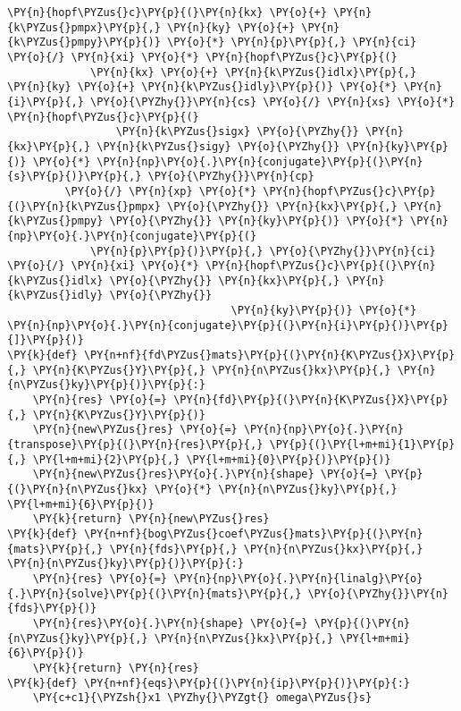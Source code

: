 \begin{Verbatim}[commandchars=\\\{\}]
         \PY{n}{hopf\PYZus{}c}\PY{p}{(}\PY{n}{kx} \PY{o}{+} \PY{n}{k\PYZus{}pmpx}\PY{p}{,} \PY{n}{ky} \PY{o}{+} \PY{n}{k\PYZus{}pmpy}\PY{p}{)} \PY{o}{*} \PY{n}{p}\PY{p}{,} \PY{n}{ci} \PY{o}{/} \PY{n}{xi} \PY{o}{*} \PY{n}{hopf\PYZus{}c}\PY{p}{(}
             \PY{n}{kx} \PY{o}{+} \PY{n}{k\PYZus{}idlx}\PY{p}{,} \PY{n}{ky} \PY{o}{+} \PY{n}{k\PYZus{}idly}\PY{p}{)} \PY{o}{*} \PY{n}{i}\PY{p}{,} \PY{o}{\PYZhy{}}\PY{n}{cs} \PY{o}{/} \PY{n}{xs} \PY{o}{*} \PY{n}{hopf\PYZus{}c}\PY{p}{(}
                 \PY{n}{k\PYZus{}sigx} \PY{o}{\PYZhy{}} \PY{n}{kx}\PY{p}{,} \PY{n}{k\PYZus{}sigy} \PY{o}{\PYZhy{}} \PY{n}{ky}\PY{p}{)} \PY{o}{*} \PY{n}{np}\PY{o}{.}\PY{n}{conjugate}\PY{p}{(}\PY{n}{s}\PY{p}{)}\PY{p}{,} \PY{o}{\PYZhy{}}\PY{n}{cp}
         \PY{o}{/} \PY{n}{xp} \PY{o}{*} \PY{n}{hopf\PYZus{}c}\PY{p}{(}\PY{n}{k\PYZus{}pmpx} \PY{o}{\PYZhy{}} \PY{n}{kx}\PY{p}{,} \PY{n}{k\PYZus{}pmpy} \PY{o}{\PYZhy{}} \PY{n}{ky}\PY{p}{)} \PY{o}{*} \PY{n}{np}\PY{o}{.}\PY{n}{conjugate}\PY{p}{(}
             \PY{n}{p}\PY{p}{)}\PY{p}{,} \PY{o}{\PYZhy{}}\PY{n}{ci} \PY{o}{/} \PY{n}{xi} \PY{o}{*} \PY{n}{hopf\PYZus{}c}\PY{p}{(}\PY{n}{k\PYZus{}idlx} \PY{o}{\PYZhy{}} \PY{n}{kx}\PY{p}{,} \PY{n}{k\PYZus{}idly} \PY{o}{\PYZhy{}}
                                   \PY{n}{ky}\PY{p}{)} \PY{o}{*} \PY{n}{np}\PY{o}{.}\PY{n}{conjugate}\PY{p}{(}\PY{n}{i}\PY{p}{)}\PY{p}{]}\PY{p}{)}
\PY{k}{def} \PY{n+nf}{fd\PYZus{}mats}\PY{p}{(}\PY{n}{K\PYZus{}X}\PY{p}{,} \PY{n}{K\PYZus{}Y}\PY{p}{,} \PY{n}{n\PYZus{}kx}\PY{p}{,} \PY{n}{n\PYZus{}ky}\PY{p}{)}\PY{p}{:}
    \PY{n}{res} \PY{o}{=} \PY{n}{fd}\PY{p}{(}\PY{n}{K\PYZus{}X}\PY{p}{,} \PY{n}{K\PYZus{}Y}\PY{p}{)}
    \PY{n}{new\PYZus{}res} \PY{o}{=} \PY{n}{np}\PY{o}{.}\PY{n}{transpose}\PY{p}{(}\PY{n}{res}\PY{p}{,} \PY{p}{(}\PY{l+m+mi}{1}\PY{p}{,} \PY{l+m+mi}{2}\PY{p}{,} \PY{l+m+mi}{0}\PY{p}{)}\PY{p}{)}
    \PY{n}{new\PYZus{}res}\PY{o}{.}\PY{n}{shape} \PY{o}{=} \PY{p}{(}\PY{n}{n\PYZus{}kx} \PY{o}{*} \PY{n}{n\PYZus{}ky}\PY{p}{,} \PY{l+m+mi}{6}\PY{p}{)}
    \PY{k}{return} \PY{n}{new\PYZus{}res}
\PY{k}{def} \PY{n+nf}{bog\PYZus{}coef\PYZus{}mats}\PY{p}{(}\PY{n}{mats}\PY{p}{,} \PY{n}{fds}\PY{p}{,} \PY{n}{n\PYZus{}kx}\PY{p}{,} \PY{n}{n\PYZus{}ky}\PY{p}{)}\PY{p}{:}
    \PY{n}{res} \PY{o}{=} \PY{n}{np}\PY{o}{.}\PY{n}{linalg}\PY{o}{.}\PY{n}{solve}\PY{p}{(}\PY{n}{mats}\PY{p}{,} \PY{o}{\PYZhy{}}\PY{n}{fds}\PY{p}{)}
    \PY{n}{res}\PY{o}{.}\PY{n}{shape} \PY{o}{=} \PY{p}{(}\PY{n}{n\PYZus{}ky}\PY{p}{,} \PY{n}{n\PYZus{}kx}\PY{p}{,} \PY{l+m+mi}{6}\PY{p}{)}
    \PY{k}{return} \PY{n}{res}
\PY{k}{def} \PY{n+nf}{eqs}\PY{p}{(}\PY{n}{ip}\PY{p}{)}\PY{p}{:}
    \PY{c+c1}{\PYZsh{}x1 \PYZhy{}\PYZgt{} omega\PYZus{}s}

\end{Verbatim}
